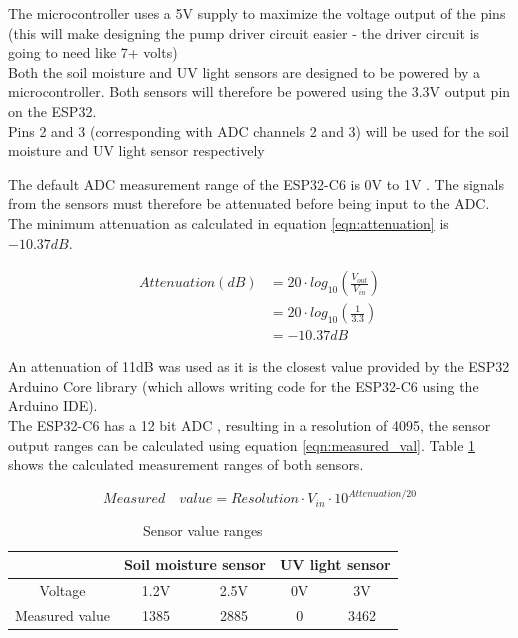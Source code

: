The microcontroller uses a 5V supply to maximize the voltage output of the pins (this will make designing the pump driver circuit easier - the driver circuit is going to need like 7+ volts)
\\


Both the soil moisture and UV light sensors are designed to be powered by a microcontroller. Both sensors will therefore be powered using the 3.3V output pin on the ESP32. 
\\
Pins 2 and 3 (corresponding with ADC channels 2 and 3) will be used for the soil moisture and UV light sensor respectively

The default ADC measurement range of the ESP32-C6 is 0V to 1V \cite{esp_datasheet} \cite{esp_github}. The signals from the sensors must therefore be attenuated before being input to the ADC. The minimum attenuation as calculated in equation \ref{eqn:attenuation} \cite{attenuation_formula} is \(-10.37 dB\).

\begin{equation}
\label{eqn:attenuation}
\begin{split}
    Attenuation  (dB) & = 20 \cdot log_{10}\left ( \frac{V_{out}}{V_{in}} \right ) \\ 
    & = 20 \cdot log_{10}\left ( \frac{1}{3.3} \right ) \\ 
    & = -10.37 dB
\end{split}
\end{equation}

An attenuation of 11dB was used as it is the closest value provided by the ESP32 Arduino Core library \cite{esp_arduino_github} (which allows writing code for the ESP32-C6 using the Arduino IDE). 
\\
The ESP32-C6 has a 12 bit ADC \cite{esp_tech_ref}, resulting in a resolution of 4095, the sensor output ranges can be calculated using equation \ref{eqn:measured_val}. Table \ref{tab:sensor_ranges} shows the calculated measurement ranges of both sensors.

\begin{equation}
\label{eqn:measured_val}
    Measured \quad value = Resolution \cdot V_{in} \cdot 10^{Attenuation / 20}
\end{equation}

\begin{table}[!h]
    \centering
    \begin{tabular}{|c|cc|cc|}
    \hline
         & \multicolumn{2}{c||}{Soil moisture sensor} & \multicolumn{2}{c|}{UV light sensor} \\
        \hline
        Voltage & 1.2V & 2.5V & 0V & 3V \\
        Measured value & 1385 & 2885 & 0 & 3462\\
        \hline
    \end{tabular}
    \caption{Sensor value ranges}
    \label{tab:sensor_ranges}
\end{table}

